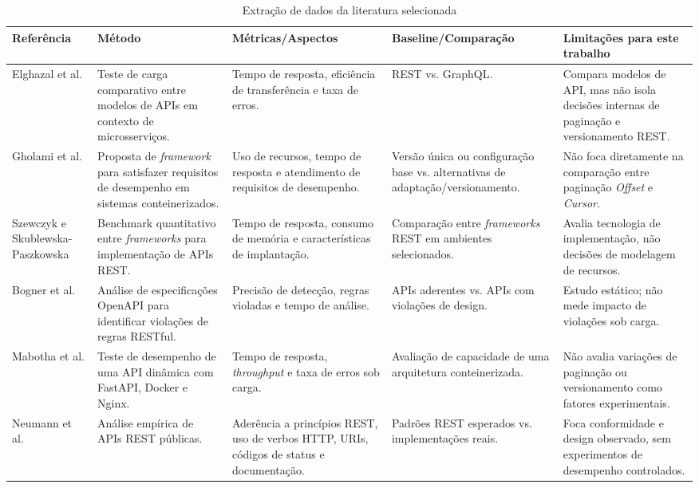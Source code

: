 \documentclass[journal]{IEEEtran}
\begin{document}
\begin{table}[htbp]
\caption{Extração de dados da literatura selecionada}
\label{tab:extracao}
\centering
\renewcommand{\arraystretch}{1.25}
\begin{tabularx}{\textwidth}{|p{3.0cm}|X|X|X|X|}
\hline
\textbf{Referência} & \textbf{Método} & \textbf{Métricas/Aspectos} & \textbf{Baseline/Comparação} & \textbf{Limitações para este trabalho} \\
\hline
Elghazal et al. \cite{elghazal2025} & Teste de carga comparativo entre modelos de APIs em contexto de microsserviços. & Tempo de resposta, eficiência de transferência e taxa de erros. & REST vs. GraphQL. & Compara modelos de API, mas não isola decisões internas de paginação e versionamento REST. \\
\hline
Gholami et al. \cite{gholami2020} & Proposta de \textit{framework} para satisfazer requisitos de desempenho em sistemas conteinerizados. & Uso de recursos, tempo de resposta e atendimento de requisitos de desempenho. & Versão única ou configuração base vs. alternativas de adaptação/versionamento. & Não foca diretamente na comparação entre paginação \textit{Offset} e \textit{Cursor}. \\
\hline
Szewczyk e Skublewska-Paszkowska \cite{szewczyk2025} & Benchmark quantitativo entre \textit{frameworks} para implementação de APIs REST. & Tempo de resposta, consumo de memória e características de implantação. & Comparação entre \textit{frameworks} REST em ambientes selecionados. & Avalia tecnologia de implementação, não decisões de modelagem de recursos. \\
\hline
Bogner et al. \cite{bogner2024} & Análise de especificações OpenAPI para identificar violações de regras RESTful. & Precisão de detecção, regras violadas e tempo de análise. & APIs aderentes vs. APIs com violações de design. & Estudo estático; não mede impacto de violações sob carga. \\
\hline
Mabotha et al. \cite{mabotha2024} & Teste de desempenho de uma API dinâmica com FastAPI, Docker e Nginx. & Tempo de resposta, \textit{throughput} e taxa de erros sob carga. & Avaliação de capacidade de uma arquitetura conteinerizada. & Não avalia variações de paginação ou versionamento como fatores experimentais. \\
\hline
Neumann et al. \cite{neumann2021} & Análise empírica de APIs REST públicas. & Aderência a princípios REST, uso de verbos HTTP, URIs, códigos de status e documentação. & Padrões REST esperados vs. implementações reais. & Foca conformidade e design observado, sem experimentos de desempenho controlados. \\

\end{tabularx}
\end{table}
\end{document}
